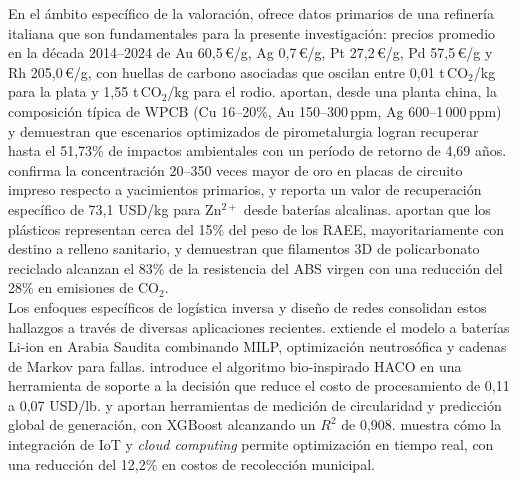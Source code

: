 En el ámbito específico de la valoración, \cite{cespiLCAPreciousMetals2025} ofrece datos primarios de una refinería italiana que son fundamentales para la presente investigación: precios promedio en la década 2014--2024 de Au 60{,}5\,€/g, Ag 0{,}7\,€/g, Pt 27{,}2\,€/g, Pd 57{,}5\,€/g y Rh 205{,}0\,€/g, con huellas de carbono asociadas que oscilan entre 0{,}01 t\,CO\(_2\)/kg para la plata y 1{,}55 t\,CO\(_2\)/kg para el rodio. \cite{wangEwasteRecyclingIntegrated2025} aportan, desde una planta china, la composición típica de WPCB (Cu 16--20\%, Au 150--300\,ppm, Ag 600--1\,000\,ppm) y demuestran que escenarios optimizados de pirometalurgia logran recuperar hasta el 51{,}73\% de impactos ambientales con un período de retorno de 4{,}69 años. \cite{qinPreciousMetalRecycling2025} confirma la concentración 20--350 veces mayor de oro en placas de circuito impreso respecto a yacimientos primarios, y \cite{gheibiTurningEwasteValue2026} reporta un valor de recuperación específico de 73{,}1 USD/kg para Zn\(^{2+}\) desde baterías alcalinas. \cite{mtibeSustainableValorizationConversion2023} aportan que los plásticos representan cerca del 15\% del peso de los RAEE, mayoritariamente con destino a relleno sanitario, y demuestran que filamentos 3D de policarbonato reciclado alcanzan el 83\% de la resistencia del ABS virgen con una reducción del 28\% en emisiones de CO\(_2\).\\

Los enfoques específicos de logística inversa y diseño de redes consolidan estos hallazgos a través de diversas aplicaciones recientes. \cite{almuwalladManagingEwasteReverse2026} extiende el modelo a baterías Li-ion en Arabia Saudita combinando MILP, optimización neutrosófica y cadenas de Markov para fallas. \cite{rahmanDecisionSupportTool2023} introduce el algoritmo bio-inspirado HACO en una herramienta de soporte a la decisión que reduce el costo de procesamiento de 0{,}11 a 0{,}07 USD/lb. \cite{alzubiBridgingCircularityMeasurement2025} y \cite{alsabtOptimizingWasteManagement2024} aportan herramientas de medición de circularidad y predicción global de generación, con XGBoost alcanzando un \(R^2\) de 0{,}908. \cite{banyaiRealTimeOperationalDecision2025} muestra cómo la integración de IoT y \textit{cloud computing} permite optimización en tiempo real, con una reducción del 12{,}2\% en costos de recolección municipal.\\

